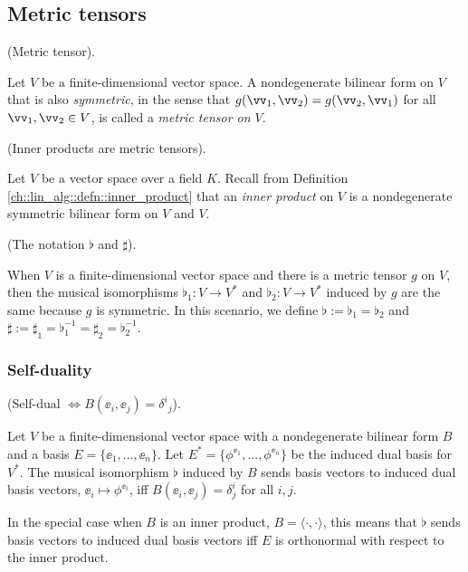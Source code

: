 \subsection*{Metric tensors}

\begin{defn}
    (Metric tensor).
    
    Let $V$ be a finite-dimensional vector space. A nondegenerate bilinear form on $V$ that is also \textit{symmetric}, in the sense that $g(\vv_1, \vv_2) = g(\vv_2, \vv_1)$ for all $\vv_1, \vv_2 \in V$, is called a \textit{metric tensor on $V$}.
\end{defn}

\begin{remark}
    (Inner products are metric tensors).
    
    Let $V$ be a vector space over a field $K$. Recall from Definition     \ref{ch::lin_alg::defn::inner_product} that an \textit{inner product} on $V$ is a nondegenerate symmetric bilinear form on $V$ and $V$.
\end{remark}

\begin{defn}
    (The notation $\flat$ and $\sharp$).
    
    When $V$ is a finite-dimensional vector space and there is a metric tensor $g$ on $V$, then the musical isomorphisms ${\flat_1:V \rightarrow V^*}$ and ${\flat_2:V \rightarrow V^*}$ induced by $g$ are the same because $g$ is symmetric. In this scenario, we define $\flat := \flat_1 = \flat_2$ and $\sharp := \sharp_1 = \flat_1^{-1} = \sharp_2 = \flat_2^{-1}$.
\end{defn}

\subsubsection*{Self-duality}

\begin{theorem}
     (Self-dual $\iff B(\ee_i, \ee_j) = \delta^i{}_j$).
     
     Let $V$ be a finite-dimensional vector space with a nondegenerate bilinear form $B$ and a basis $E = \{\ee_1, ..., \ee_n\}$. Let $E^* = \{\phi^{\ee_1}, ..., \phi^{\ee_n}\}$ be the induced dual basis for $V^*$. The musical isomorphism $\flat$ induced by $B$ sends basis vectors to induced dual basis vectors, $\ee_i \mapsto \phi^{\ee_i}$, iff $B(\ee_i, 
     \ee_j) = \delta^i_j$ for all $i, j$. 
     
     In the special case when $B$ is an inner product, $B = \langle \cdot, \cdot \rangle$, this means that $\flat$ sends basis vectors to induced dual basis vectors iff $E$ is orthonormal with respect to the inner product.
\end{theorem}

